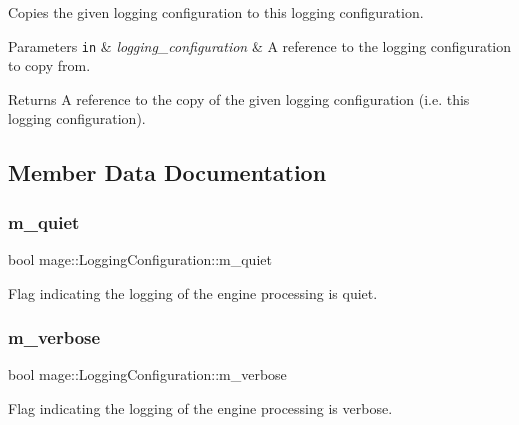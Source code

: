 Copies the given logging configuration to this logging configuration.


\begin{DoxyParams}[1]{Parameters}
\mbox{\tt in}  & {\em logging\+\_\+configuration} & A reference to the logging configuration to copy from. \\
\hline
\end{DoxyParams}
\begin{DoxyReturn}{Returns}
A reference to the copy of the given logging configuration (i.\+e. this logging configuration). 
\end{DoxyReturn}


\subsection{Member Data Documentation}
\hypertarget{structmage_1_1_logging_configuration_a38f457d5db84d15e008841ca8653b47c}{}\label{structmage_1_1_logging_configuration_a38f457d5db84d15e008841ca8653b47c} 
\subsubsection{\texorpdfstring{m\+\_\+quiet}{m\_quiet}}
{\footnotesize\ttfamily bool mage\+::\+Logging\+Configuration\+::m\+\_\+quiet\hspace{0.3cm}{\ttfamily [private]}}

Flag indicating the logging of the engine processing is quiet. \hypertarget{structmage_1_1_logging_configuration_a60f052c2bb702d8153188e93f00427ac}{}\label{structmage_1_1_logging_configuration_a60f052c2bb702d8153188e93f00427ac} 
\subsubsection{\texorpdfstring{m\+\_\+verbose}{m\_verbose}}
{\footnotesize\ttfamily bool mage\+::\+Logging\+Configuration\+::m\+\_\+verbose\hspace{0.3cm}{\ttfamily [private]}}

Flag indicating the logging of the engine processing is verbose. 